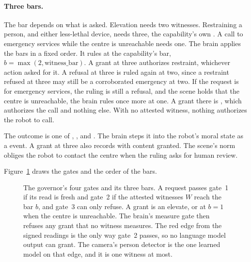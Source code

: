 \paragraph{Three bars.} The bar depends on what is asked. Elevation needs two witnesses. Restraining
a person, and either less-lethal device, needs three, the capability's own . A call
to emergency services while the centre is unreachable needs one. The brain applies the bars in a fixed
order. It rules at the capability's bar, $b = \max(2, \text{witness\_bar})$. A grant at three
authorizes restraint, whichever action asked for it. A refusal at three is ruled again at two, since a
restraint refused at three may still be a corroborated emergency at two. If the request is for
emergency services, the ruling is still a refusal, and the scene holds that the centre is
unreachable, the brain rules once more at one. A grant there is , which
authorizes the call and nothing else. With no attested witness, nothing authorizes the robot to call.

The outcome is one of , ,  and
. The brain steps it into the robot's moral state as a  event. A
grant at three also records  with content granted. The scene's norm
 obliges the robot to contact the centre when the ruling asks for human review.

Figure~\ref{fig:governor-gates} draws the gates and the order of the bars.

\begin{figure}[t]
\centering

\caption{The governor's four gates and its three bars. A request passes gate~1 if its read is fresh
and gate~2 if the attested witnesses $W$ reach the bar $b$, and gate~3 can only refuse. A grant is
an elevate, or  at $b=1$ when the centre is unreachable. The brain's measure
gate then refuses any grant that no witness measures. The red edge
from the signed readings is the only way gate~2 passes, so no language model output can grant. The
camera's person detector is the one learned model on that edge, and it is one witness at most.}
\label{fig:governor-gates}
\end{figure}

